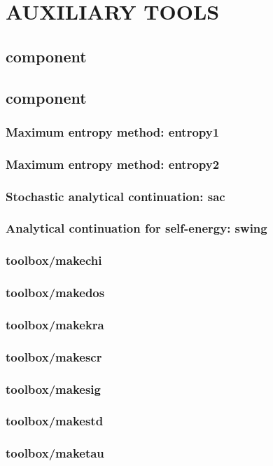 \documentclass[10pt]{book}
\begin{document}
\chapter{AUXILIARY TOOLS}
\section{{\jasmine} component}
\section{{\hibiscus} component}
\subsection{Maximum entropy method: entropy1}
\subsection{Maximum entropy method: entropy2}
\subsection{Stochastic analytical continuation: sac}
\subsection{Analytical continuation for self-energy: swing}
\subsection{toolbox/makechi}
\subsection{toolbox/makedos}
\subsection{toolbox/makekra}
\subsection{toolbox/makescr}
\subsection{toolbox/makesig}
\subsection{toolbox/makestd}
\subsection{toolbox/maketau}
\end{document}
